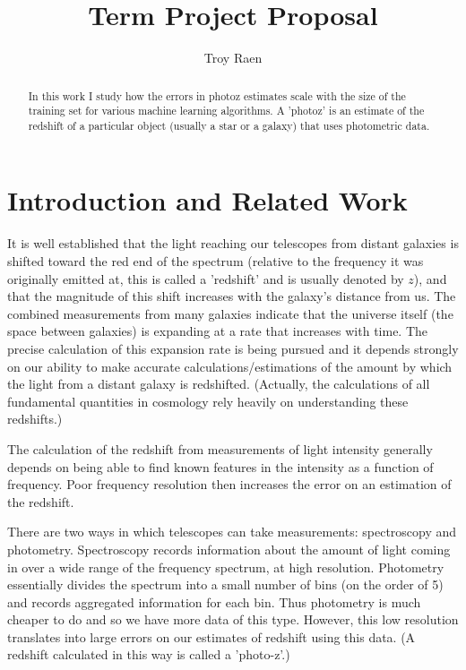 \documentclass[13pt]{amsart}
\title{Term Project Proposal}
\author{Troy Raen}
\begin{document}
\maketitle



\begin{abstract}
  In this work I study how the errors in photoz estimates scale with the size of the training set for various machine learning algorithms. A 'photoz' is an estimate of the redshift of a particular object (usually a star or a galaxy) that uses photometric data.
\end{abstract}


\section{Introduction and Related Work}

It is well established that the light reaching our telescopes from distant galaxies is shifted toward the red end of the spectrum (relative to the frequency it was originally emitted at, this is called a 'redshift' and is usually denoted by $z$), and that the magnitude of this shift increases with the galaxy's distance from us. The combined measurements from many galaxies indicate that the universe itself (the space between galaxies) is expanding at a rate that increases with time. The precise calculation of this expansion rate is being pursued and it depends strongly on our ability to make accurate calculations/estimations of the amount by which the light from a distant galaxy is redshifted. (Actually, the calculations of all fundamental quantities in cosmology rely heavily on understanding these redshifts.)

The calculation of the redshift from measurements of light intensity generally depends on being able to find known features in the intensity as a function of frequency. Poor frequency resolution then increases the error on an estimation of the redshift.

There are two ways in which telescopes can take measurements: spectroscopy and photometry. Spectroscopy records information about the amount of light coming in over a wide range of the frequency spectrum, at high resolution. Photometry essentially divides the spectrum into a small number of bins (on the order of 5) and records aggregated information for each bin. Thus photometry is much cheaper to do and so we have more data of this type. However, this low resolution translates into large errors on our estimates of redshift using this data. (A redshift calculated in this way is called a 'photo-z'.)
\end{document}
